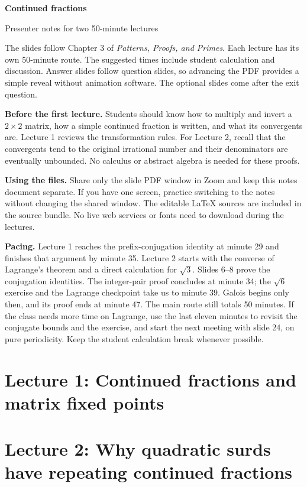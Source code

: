 \documentclass[11pt]{article}
\newcounter{slide}
\newcounter{elapsed}
\begin{document}
{\huge\bfseries Continued fractions\par}
{\Large Presenter notes for two 50-minute lectures\par}
\vspace{10pt}
The slides follow Chapter 3 of \emph{Patterns, Proofs, and Primes}.
Each lecture has its own 50-minute route. The suggested times include
student calculation and discussion. Answer slides follow question slides,
so advancing the PDF provides a simple reveal without animation software.
The optional slides come after the exit question.

\textbf{Before the first lecture.}
Students should know how to multiply and invert a $2\times2$ matrix,
how a simple continued fraction is written, and what its convergents are.
Lecture 1 reviews the transformation rules.
For Lecture 2, recall that the convergents tend to the original
irrational number and their denominators are eventually unbounded.
No calculus or abstract algebra is needed for these proofs.

\textbf{Using the files.}
Share only the slide PDF window in Zoom and keep this notes document
separate. If you have one screen, practice switching to the notes
without changing the shared window. The editable LaTeX sources are
included in the source bundle. No live web services or fonts need to
download during the lectures.

\textbf{Pacing.}
Lecture 1 reaches the prefix-conjugation identity at minute 29 and
finishes that argument by minute 35.
Lecture 2 starts with the converse of Lagrange's theorem and a direct
calculation for $\sqrt3$. Slides 6--8 prove the conjugation identities.
The integer-pair proof concludes at minute 34; the $\sqrt6$ exercise
and the Lagrange checkpoint take us to minute 39. Galois begins only
then, and its proof ends at minute 47. The main route still totals
50 minutes. If the class needs more time on Lagrange, use the last
eleven minutes to revisit the conjugate bounds and the exercise,
and start the next meeting with slide 24, on pure periodicity.
Keep the student calculation break whenever possible.

\section*{Lecture 1: Continued fractions and matrix fixed points}

\clearpage
\setcounter{slide}{0}\setcounter{elapsed}{0}
\section*{Lecture 2: Why quadratic surds have repeating continued fractions}

\clearpage
\end{document}
